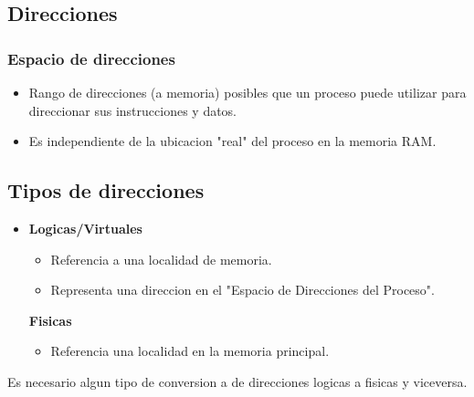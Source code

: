 \subsection{Direcciones}
\subsubsection{Espacio de direcciones}
\begin{itemize}
    \item Rango de direcciones (a memoria) posibles que un proceso puede utilizar para direccionar sus instrucciones y datos.
    \item Es independiente de la ubicacion "real" del proceso en la memoria RAM.
\end{itemize}

\subsection{Tipos de direcciones}
\begin{itemize}
    \item \textbf{Logicas/Virtuales}
    \begin{itemize}
        \item Referencia a una localidad de memoria.
        \item Representa una direccion en el "Espacio de Direcciones del Proceso".
    \end{itemize}
    \textbf{Fisicas}
    \begin{itemize}
        \item Referencia una localidad en la memoria principal.
    \end{itemize}
\end{itemize}
Es necesario algun tipo de conversion a de direcciones logicas a fisicas y viceversa.
